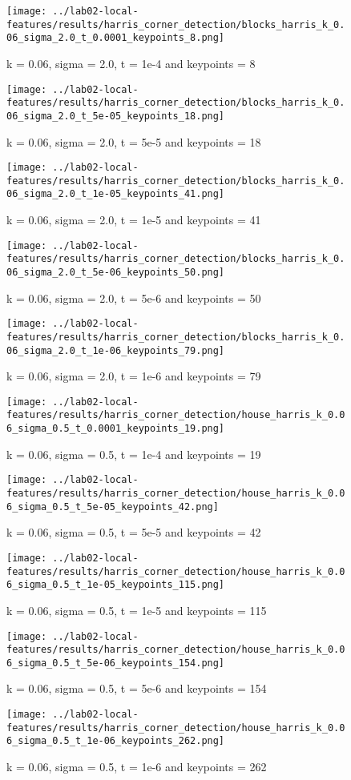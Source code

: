 \documentclass{ETHExercise}
\begin{document}
\begin{figure}
    \texttt{[image: ../lab02-local-features/results/harris\_corner\_detection/blocks\_harris\_k\_0.06\_sigma\_2.0\_t\_0.0001\_keypoints\_8.png]}
    \caption{k = 0.06, sigma = 2.0, t = 1e-4 and keypoints = 8}
  \endminipage\hfill
    \texttt{[image: ../lab02-local-features/results/harris\_corner\_detection/blocks\_harris\_k\_0.06\_sigma\_2.0\_t\_5e-05\_keypoints\_18.png]}
    \caption{k = 0.06, sigma = 2.0, t = 5e-5 and keypoints = 18}
  \endminipage\hfill
    \texttt{[image: ../lab02-local-features/results/harris\_corner\_detection/blocks\_harris\_k\_0.06\_sigma\_2.0\_t\_1e-05\_keypoints\_41.png]}
    \caption{k = 0.06, sigma = 2.0, t = 1e-5 and keypoints = 41}
  \endminipage\hfill
    \texttt{[image: ../lab02-local-features/results/harris\_corner\_detection/blocks\_harris\_k\_0.06\_sigma\_2.0\_t\_5e-06\_keypoints\_50.png]}
    \caption{k = 0.06, sigma = 2.0, t = 5e-6 and keypoints = 50}
  \endminipage\space\space\space 
    \texttt{[image: ../lab02-local-features/results/harris\_corner\_detection/blocks\_harris\_k\_0.06\_sigma\_2.0\_t\_1e-06\_keypoints\_79.png]}
    \caption{k = 0.06, sigma = 2.0, t = 1e-6 and keypoints = 79}
  \endminipage
\end{figure}
\begin{figure}
      \texttt{[image: ../lab02-local-features/results/harris\_corner\_detection/house\_harris\_k\_0.06\_sigma\_0.5\_t\_0.0001\_keypoints\_19.png]}
      \caption{k = 0.06, sigma = 0.5, t = 1e-4 and keypoints = 19}
    \endminipage\hfill
      \texttt{[image: ../lab02-local-features/results/harris\_corner\_detection/house\_harris\_k\_0.06\_sigma\_0.5\_t\_5e-05\_keypoints\_42.png]}
      \caption{k = 0.06, sigma = 0.5, t = 5e-5 and keypoints = 42}
    \endminipage\hfill
      \texttt{[image: ../lab02-local-features/results/harris\_corner\_detection/house\_harris\_k\_0.06\_sigma\_0.5\_t\_1e-05\_keypoints\_115.png]}
      \caption{k = 0.06, sigma = 0.5, t = 1e-5 and keypoints = 115}
    \endminipage\hfill
     \texttt{[image: ../lab02-local-features/results/harris\_corner\_detection/house\_harris\_k\_0.06\_sigma\_0.5\_t\_5e-06\_keypoints\_154.png]}
      \caption{k = 0.06, sigma = 0.5, t = 5e-6 and keypoints = 154}
    \endminipage\space\space\space 
      \texttt{[image: ../lab02-local-features/results/harris\_corner\_detection/house\_harris\_k\_0.06\_sigma\_0.5\_t\_1e-06\_keypoints\_262.png]}
      \caption{k = 0.06, sigma = 0.5, t = 1e-6 and keypoints = 262}
    \endminipage
  \end{figure}
\end{document}
